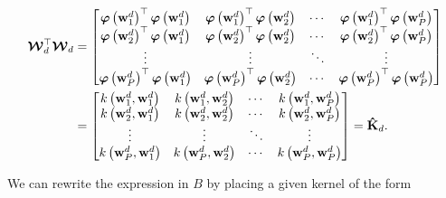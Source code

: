 	\begin{align}
	\projMat^\top \projMat 
	&=\left[
	\begin{matrix}
	\phiwld{1}^\top\phiwld{1}& \phiwld{1}^\top\phiwld{2} & \cdots & \phiwld{1}^\top\phiwld{P} \\
	\phiwld{2}^\top\phiwld{1}& \phiwld{2}^\top\phiwld{2} & \cdots & \phiwld{2}^\top\phiwld{P} \\
	\vdots  & \vdots  & \ddots & \vdots  \\
	\phiwld{P}^\top\phiwld{1}& \phiwld{P}^\top\phiwld{2} & \cdots & \phiwld{P}^\top\phiwld{P}
	\end{matrix}\right] \notag\\
	&=
	\left[ \begin{matrix}
	\kernelww{1}{1} & \kernelww{1}{2} & \cdots & \kernelww{1}{P}\\
	\kernelww{2}{1} & \kernelww{2}{2} & \cdots & \kernelww{2}{P}\\
	\vdots  & \vdots  & \ddots & \vdots  \\
	\kernelww{P}{1} & \kernelww{P}{2} & \cdots & \kernelww{P}{P}\\
	\end{matrix}\right] = \mathbf{\hat{K}}_{d}. \label{eq:Kp}
	\end{align}
	
	
	We can rewrite the expression in $B$ by placing a given kernel of the form
	
